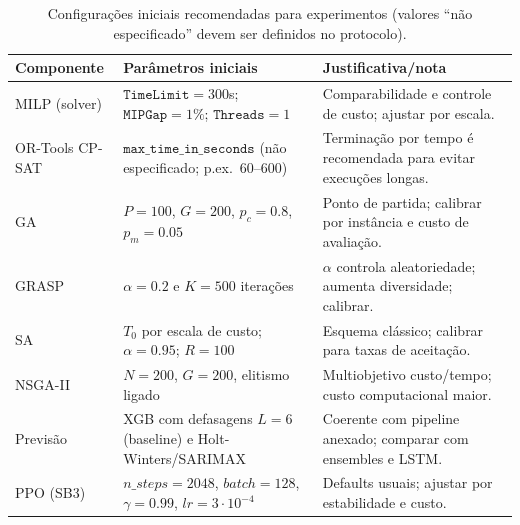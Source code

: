 \begin{table}[htbp]
\centering
\small
\renewcommand{\arraystretch}{1.15}
\begin{tabular}{p{} p{} p{}}
\toprule
\textbf{Componente} & \textbf{Parâmetros iniciais} & \textbf{Justificativa/nota} \\
\midrule
MILP (solver) & \(\texttt{TimeLimit}=300\)s; \(\texttt{MIPGap}=1\%\); \(\texttt{Threads}=1\) & Comparabilidade e controle de custo; ajustar por escala. \cite{GurobiParamGuidelines} \\
OR-Tools CP-SAT & \(\texttt{max\_time\_in\_seconds}\) (não especificado; p.ex.\ 60--600) & Terminação por tempo é recomendada para evitar execuções longas. \cite{ORToolsCPSATSolver} \\
GA & \(P=100\), \(G=200\), \(p_c=0.8\), \(p_m=0.05\) & Ponto de partida; calibrar por instância e custo de avaliação. \cite{Talbi2009Metaheuristics} \\
GRASP & \(\alpha=0.2\) e \(K=500\) iterações & \(\alpha\) controla aleatoriedade; aumenta diversidade; calibrar. \cite{FeoResende1995GRASP} \\
SA & \(T_0\) por escala de custo; \(\alpha=0.95\); \(R=100\) & Esquema clássico; calibrar para taxas de aceitação. \cite{Kirkpatrick1983SA} \\
NSGA-II & \(N=200\), \(G=200\), elitismo ligado & Multiobjetivo custo/tempo; custo computacional maior. \cite{Deb2002NSGA2} \\
Previsão & XGB com defasagens \(L=6\) (baseline) e Holt-Winters/SARIMAX & Coerente com pipeline anexado; comparar com ensembles e LSTM. \cite{Nasseri2023RetailDemandPrediction} \\
PPO (SB3) & \(n\_steps=2048\), \(batch=128\), \(\gamma=0.99\), \(lr=3\cdot10^{-4}\) & Defaults usuais; ajustar por estabilidade e custo. \cite{SB3PPO} \\
\bottomrule
\end{tabular}
\caption{Configurações iniciais recomendadas para experimentos (valores ``não especificado'' devem ser definidos no protocolo).}
\label{tab:defaults}
\end{table}



